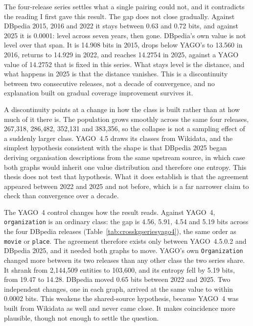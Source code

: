 The four-release series settles what a single pairing could not, and it
contradicts the reading I first gave this result. The gap does not close
gradually. Against DBpedia 2015, 2016 and 2022 it stays between 0.63 and 0.72
bits, and against 2025 it is 0.0001: level across seven years, then gone.
DBpedia's own value is not level over that span. It is 14.908 bits in 2015,
drops below YAGO's to 13.560 in 2016, returns to 14.929 in 2022, and reaches
14.2754 in 2025, against a YAGO value of 14.2752 that is fixed in this series. What stays
level is the distance, and what happens in 2025 is that the distance vanishes.
This is a discontinuity between two consecutive releases, not a decade of
convergence, and no explanation built on gradual coverage improvement survives
it.

A discontinuity points at a change in how the class is built rather than at how
much of it there is. The population grows smoothly across the same four
releases, 267{,}318, 286{,}482, 352{,}131 and 383{,}356, so the collapse is not
a sampling effect of a suddenly larger class. YAGO~4.5 draws its classes from
Wikidata, and the simplest hypothesis consistent with the shape is that DBpedia
2025 began deriving organisation descriptions from the same upstream source, in
which case both graphs would inherit one value distribution and therefore one
entropy. This thesis does not test that hypothesis. What it does establish is
that the agreement appeared between 2022 and 2025 and not before, which is a far
narrower claim to check than convergence over a decade.

The YAGO~4 control changes how the result reads. Against YAGO~4,
\texttt{organization} is an ordinary class: the gap is 4.56, 5.91, 4.54 and 5.19
bits across the four DBpedia releases (Table~\ref{tab:crosskgseriesyago4}), the
same order as \texttt{movie} or \texttt{place}. The agreement therefore exists
only between YAGO~4.5.0.2 and DBpedia 2025, and it needed both graphs to move.
YAGO's own \texttt{Organization} changed more between its two releases than any
other class the two series share. It shrank from 2{,}144{,}509 entities to
103{,}600, and its entropy fell by 5.19 bits, from 19.47 to 14.28. DBpedia moved
0.65 bits between 2022 and 2025. Two independent changes, one in each graph,
arrived at the same value to within 0.0002 bits. This weakens the shared-source
hypothesis, because YAGO~4 was built from Wikidata as well and never came close.
It makes coincidence more plausible, though not enough to settle the question.

